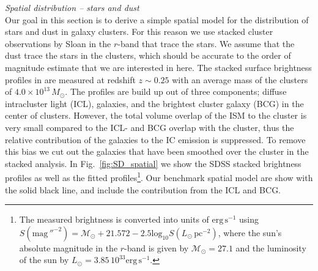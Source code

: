 \documentclass[10pt,aps,pra,reprint,amsmath,amsfonts,amssymb,showpacs]{revtex4-1}
\newcommand{\rmn}{\mathrm}
\newcommand{\msun}{M_\odot}
\begin{document}
{\it Spatial distribution -- stars and dust}\\ Our goal in this
section is to derive a simple spatial model for the distribution of
stars and dust in galaxy clusters. For this reason we use stacked
cluster observations by Sloan in the $r$-band that trace the stars. We
assume that the dust trace the stars in the clusters, which should be
accurate to the order of magnitude estimate that we are interested in
here. The stacked surface brightness profiles in
\cite{2005MNRAS.358..949Z} are measured at redshift $z \sim 0.25$ with
an average mass of the clusters of $4.0\times10^{13}\,\msun$. The
profiles are build up out of three components; diffuse intracluster
light (ICL), galaxies, and the brightest cluster galaxy (BCG) in the
center of clusters. However, the total volume overlap of the ISM to
the cluster is very small compared to the ICL- and BCG overlap with
the cluster, thus the relative contribution of the galaxies to the IC
emission is suppressed. To remove this bias we cut out the galaxies
that have been smoothed over the cluster in the stacked analysis. In
Fig.~\ref{fig:SD_spatial} we show the SDSS stacked brightness profiles
as well as the fitted profiles\footnote{The measured brightness is
  converted into units of $\rmn{erg}\,\rmn{s}^{-1}$ using
  \cite{2010...book} $S(\rmn{mag}\,''^{-2}) =
  \mathcal{M}_\odot+21.572-2.5\rmn{log}_{10}S(L_\odot\,\rmn{pc}^{-2})$,
  where the sun's absolute magnitude in the $r$-band is given by
  $\mathcal{M}_\odot=27.1$ \cite{2000asqu.book..339L} and the
  luminosity of the sun by $L_\odot=3.85\,10^{33}
  \rmn{erg}\,\rmn{s}^{-1}$.}. Our benchmark spatial model are show
with the solid black line, and include the contribution from the ICL
and BCG.
\end{document}
